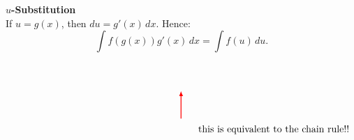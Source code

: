 \documentclass[12pt]{article}
\begin{document}
	\vspace{0.25in}
	
	\begin{tcolorbox}[colback=white,colframe=black,boxrule=0.5pt]
	\noindent\textbf{$u$-Substitution}\\
		If $u=g(x)$, then $du=g'(x)\,dx$. Hence:
		$$\int f(g(x))g'(x)\,dx=\int f(u)\,du.$$
	\end{tcolorbox}
	\vspace{-15mm}
	$$\begin{tikzpicture}
	\coordinate (A) at (0,0);
	\coordinate (B) at (0,2);
	
	\draw [-latex, red, thick, shorten >= 1.00cm] (A) -- (B);
	\end{tikzpicture}$$
	\vspace{-10mm}
	$$\hspace{2.625in}\text{this is equivalent to the chain rule!!}$$
\end{document}

